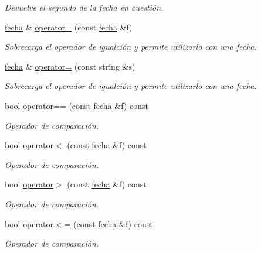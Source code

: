 \begin{DoxyCompactItemize}
\begin{DoxyCompactList}\small\item\em Devuelve el segundo de la fecha en cuestión. \end{DoxyCompactList}\item 
\hyperlink{classfecha}{fecha} \& \hyperlink{classfecha_aeb5a68104e936f98eb933b4d6856f841}{operator=} (const \hyperlink{classfecha}{fecha} \&f)
\begin{DoxyCompactList}\small\item\em Sobrecarga el operador de igualción y permite utilizarlo con una fecha. \end{DoxyCompactList}\item 
\hyperlink{classfecha}{fecha} \& \hyperlink{classfecha_afff8905488f3d97ecfe6141f8521ac22}{operator=} (const string \&s)
\begin{DoxyCompactList}\small\item\em Sobrecarga el operador de igualción y permite utilizarlo con una fecha. \end{DoxyCompactList}\item 
bool \hyperlink{classfecha_ac971e131a6e3edf57c2313468524f364}{operator==} (const \hyperlink{classfecha}{fecha} \&f) const 
\begin{DoxyCompactList}\small\item\em Operador de comparación. \end{DoxyCompactList}\item 
bool \hyperlink{classfecha_a27803300b9698e1a40ef48f2009948c5}{operator$<$} (const \hyperlink{classfecha}{fecha} \&f) const 
\begin{DoxyCompactList}\small\item\em Operador de comparación. \end{DoxyCompactList}\item 
bool \hyperlink{classfecha_aaded7646e80d88492b31b17b4fb001fd}{operator$>$} (const \hyperlink{classfecha}{fecha} \&f) const 
\begin{DoxyCompactList}\small\item\em Operador de comparación. \end{DoxyCompactList}\item 
bool \hyperlink{classfecha_a8dfb2f2a7424bdb1dacc6df122b0a0c8}{operator$<$=} (const \hyperlink{classfecha}{fecha} \&f) const 
\begin{DoxyCompactList}\small\item\em Operador de comparación. \end{DoxyCompactList}\item 

\end{DoxyCompactItemize}

